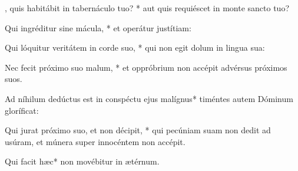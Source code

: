 \begin{psalmus}

    , quis habitábit in tabernáculo tuo? * aut quis requiéscet in monte sancto tuo?

    Qui ingréditur sine mácula, * et operátur justítiam:

    Qui lóquitur veritátem in corde suo, * qui non egit dolum in lingua sua:

    Nec fecit próximo suo malum, * et oppróbrium non accépit advérsus próximos suos.

    Ad níhilum dedúctus est in conspéctu ejus malígnus* timéntes autem Dóminum gloríficat:

    Qui jurat próximo suo, et non décipit, * qui pecúniam suam non dedit ad usúram, et múnera super innocéntem non accépit.

    Qui facit hæc* non movébitur in ætérnum.

\end{psalmus}